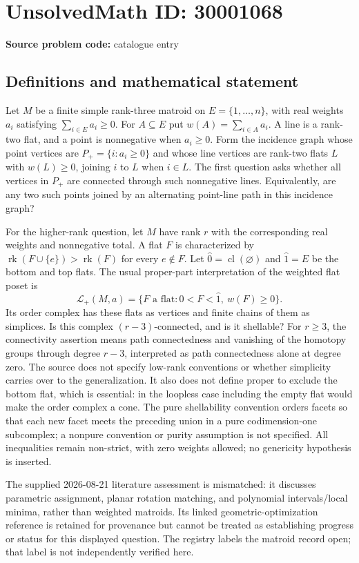 \documentclass[11pt]{article}
\begin{document}
\section*{UnsolvedMath ID: 30001068}
\textbf{Source problem code:} catalogue entry
\subsection{Definitions and mathematical statement}
Let $M$ be a finite simple rank-three matroid on $E=\{1,\ldots,n\}$, with real weights $a_i$ satisfying $\sum_{i\in E}a_i\geq0$. For $A\subseteq E$ put $w(A)=\sum_{i\in A}a_i$. A line is a rank-two flat, and a point is nonnegative when $a_i\geq0$. Form the incidence graph whose point vertices are $P_+=\{i:a_i\geq0\}$ and whose line vertices are rank-two flats $L$ with $w(L)\geq0$, joining $i$ to $L$ when $i\in L$. The first question asks whether all vertices in $P_+$ are connected through such nonnegative lines. Equivalently, are any two such points joined by an alternating point-line path in this incidence graph?\par For the higher-rank question, let $M$ have rank $r$ with the corresponding real weights and nonnegative total. A flat $F$ is characterized by $\operatorname{rk}(F\cup\{e\})>\operatorname{rk}(F)$ for every $e\notin F$. Let $\widehat0=\operatorname{cl}(\varnothing)$ and $\widehat1=E$ be the bottom and top flats. The usual proper-part interpretation of the weighted flat poset is \[\mathcal L_+(M,a)=\{F\text{ a flat}:\widehat0<F<\widehat1,\ w(F)\geq0\}.\] Its order complex has these flats as vertices and finite chains of them as simplices. Is this complex $(r-3)$-connected, and is it shellable? For $r\geq3$, the connectivity assertion means path connectedness and vanishing of the homotopy groups through degree $r-3$, interpreted as path connectedness alone at degree zero. The source does not specify low-rank conventions or whether simplicity carries over to the generalization. It also does not define proper to exclude the bottom flat, which is essential: in the loopless case including the empty flat would make the order complex a cone. The pure shellability convention orders facets so that each new facet meets the preceding union in a pure codimension-one subcomplex; a nonpure convention or purity assumption is not specified. All inequalities remain non-strict, with zero weights allowed; no genericity hypothesis is inserted.\par The supplied 2026-08-21 literature assessment is mismatched: it discusses parametric assignment, planar rotation matching, and polynomial intervals/local minima, rather than weighted matroids. Its linked geometric-optimization reference is retained for provenance but cannot be treated as establishing progress or status for this displayed question. The registry labels the matroid record open; that label is not independently verified here.
\end{document}
